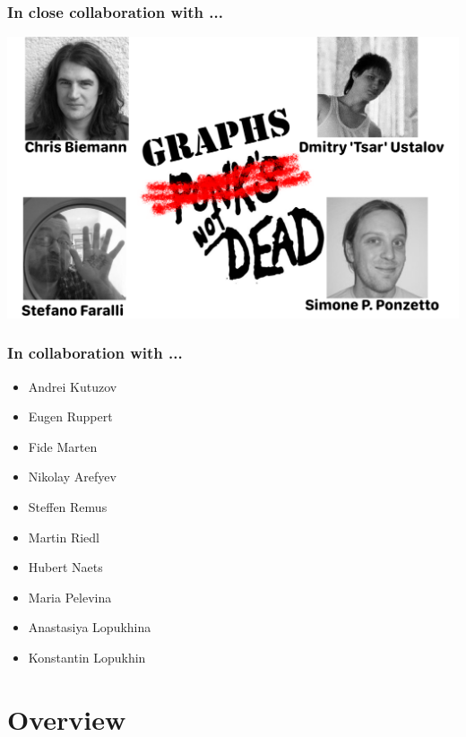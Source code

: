 
\begin{frame}
  \frametitle{In close collaboration with ... }

 \includegraphics[width=.95\textwidth]{figures/collaborators}	
\end{frame}



\begin{frame}
  \frametitle{In collaboration with ... }
  { \large \bf
  \begin{itemize}
  	\item Andrei Kutuzov
  	\item Eugen Ruppert
  	\item Fide Marten
  	\item Nikolay Arefyev
  	\item Steffen Remus
  	\item Martin Riedl
  	\item Hubert Naets
   	\item Maria Pelevina
	\item Anastasiya Lopukhina
	\item Konstantin Lopukhin
  
  \end{itemize}	
  }
\end{frame}


\section{Overview}

